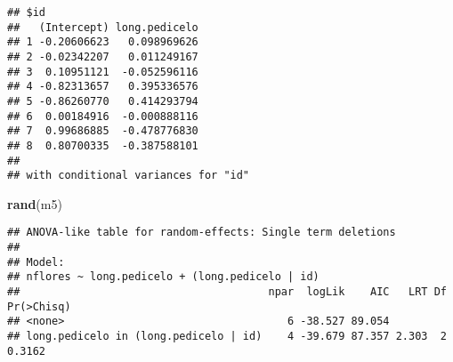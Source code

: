 \documentclass[
]{book}
\newenvironment{Shaded}{\begin{snugshade}}{\end{snugshade}}
\newcommand{\DataTypeTok}[1]{\textcolor[rgb]{0.13,0.29,0.53}{#1}}
\newcommand{\DecValTok}[1]{\textcolor[rgb]{0.00,0.00,0.81}{#1}}
\newcommand{\KeywordTok}[1]{\textcolor[rgb]{0.13,0.29,0.53}{\textbf{#1}}}
\newcommand{\NormalTok}[1]{#1}
\newcommand{\OperatorTok}[1]{\textcolor[rgb]{0.81,0.36,0.00}{\textbf{#1}}}
\newcommand{\OtherTok}[1]{\textcolor[rgb]{0.56,0.35,0.01}{#1}}
\newcommand{\StringTok}[1]{\textcolor[rgb]{0.31,0.60,0.02}{#1}}
\begin{document}
\begin{verbatim}
## $id
##   (Intercept) long.pedicelo
## 1 -0.20606623   0.098969626
## 2 -0.02342207   0.011249167
## 3  0.10951121  -0.052596116
## 4 -0.82313657   0.395336576
## 5 -0.86260770   0.414293794
## 6  0.00184916  -0.000888116
## 7  0.99686885  -0.478776830
## 8  0.80700335  -0.387588101
## 
## with conditional variances for "id"
\end{verbatim}

\begin{Shaded}
\begin{Highlighting}[]
\KeywordTok{rand}\NormalTok{(m5)}
\end{Highlighting}
\end{Shaded}

\begin{verbatim}
## ANOVA-like table for random-effects: Single term deletions
## 
## Model:
## nflores ~ long.pedicelo + (long.pedicelo | id)
##                                       npar  logLik    AIC   LRT Df Pr(>Chisq)
## <none>                                   6 -38.527 89.054                    
## long.pedicelo in (long.pedicelo | id)    4 -39.679 87.357 2.303  2     0.3162
\end{verbatim}

\begin{Shaded}
\end{Shaded}
\end{document}
